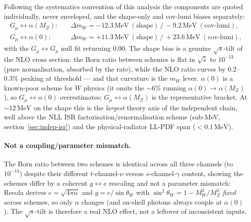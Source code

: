 \documentclass[11pt,a4paper]{article}
\newcommand{\mW}{m_W}
\newcommand{\sqrts}{\sqrt{s}}
\newcommand{\MeV}{\ensuremath{\,\mathrm{MeV}}}
\begin{document}
Following the systematics convention of this analysis the components are quoted
individually, never enveloped, and the shape-only and cov-lumi biases separately:
\begin{align*}
  G_\mu\!\leftrightarrow\!\alpha(M_Z):&\quad \Delta\mW = -12.3\MeV~(\text{shape}) \,/\, -9.2\MeV~(\text{cov-lumi}),\\
  G_\mu\!\leftrightarrow\!\alpha(0):&\quad \Delta\mW = +11.3\MeV~(\text{shape}) \,/\, +23.6\MeV~(\text{cov-lumi}),
\end{align*}
with the $G_\mu\!\leftrightarrow\!G_\mu$ null fit returning $0.00$. The shape bias
is a genuine $\sqrts$-tilt of the NLO cross section: the Born ratio between schemes
is flat in $\sqrt{\hat s}$ to $10^{-13}$ (pure normalisation, absorbed by the rate),
while the NLO ratio curves by $0.2$--$0.3\%$ peaking at threshold --- and that
curvature is the $\mW$ lever. $\alpha(0)$ is a known-poor scheme for $W$ physics
(it omits the $\sim\!6\%$ running $\alpha(0)\!\to\!\alpha(M_Z)$), so
$G_\mu\!\leftrightarrow\!\alpha(0)$ overestimates; $G_\mu\!\leftrightarrow\!\alpha(M_Z)$
is the representative bracket. At $\sim\!12\MeV$ on the shape this is the
\emph{largest} theory axis of the independent chain, well above the NLL ISR
factorisation/renormalisation scheme (sub-MeV, section~\ref{sec:indep-isr}) and the
physical-radiator LL-PDF span ($<0.1\MeV$).

\paragraph{Not a coupling/parameter mismatch.} The Born ratio between two schemes
is identical across all three channels (to $10^{-13}$) despite their different
$t$-channel-$\nu$ versus $s$-channel-$\gamma$ content, showing the schemes differ
by a coherent $g\!\leftrightarrow\!e$ rescaling and not a parameter mismatch:
Recola derives $e=\sqrt{4\pi\alpha}$ and $g=e/\sin\theta_W$ with
$\sin^2\theta_W=1-M_W^2/M_Z^2$ \emph{fixed} across schemes, so only $\alpha$ changes
(and on-shell photons always couple at $\alpha(0)$). The $\sqrts$-tilt is therefore
a real NLO effect, not a leftover of inconsistent inputs.
\end{document}
